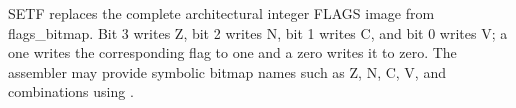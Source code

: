 SETF replaces the complete architectural integer FLAGS image from flags\_bitmap. Bit 3 writes Z, bit 2 writes N, bit 1 writes C, and bit 0 writes V; a one writes the corresponding flag to one and a zero writes it to zero. The assembler may provide symbolic bitmap names such as Z, N, C, V, and combinations using \textbar{}.
